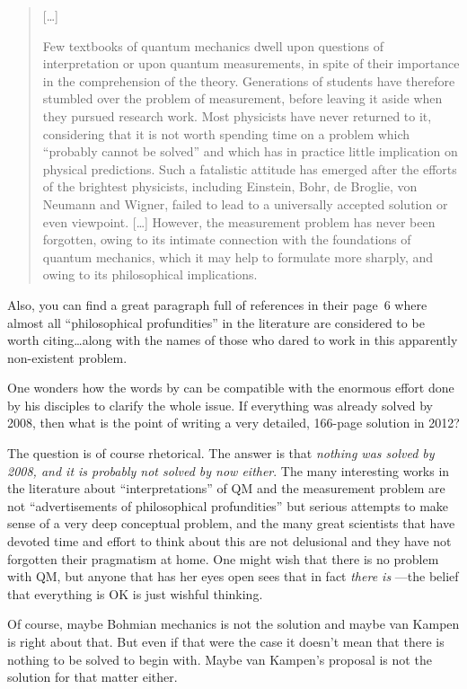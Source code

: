 \documentclass[a4paper,12pt]{article}
\begin{document}
\begin{itemize}
\begin{quote}
{[\ldots]

Few textbooks of quantum mechanics dwell upon questions of
interpretation or upon quantum measurements, in spite of their importance in
the comprehension of the theory. Generations of students have therefore
stumbled over the problem of measurement, before leaving it aside when they
pursued research work. Most physicists have never returned to it, considering
that it is not worth spending time on a problem which ``probably cannot be
solved'' and which has in practice little implication on physical predictions.
Such a fatalistic attitude has emerged after the efforts of the brightest
physicists, including Einstein, Bohr, de Broglie, von Neumann and Wigner,
failed to lead to a universally accepted solution or even viewpoint. [\ldots]
However, the measurement problem has never been forgotten, owing to its
intimate connection with the foundations of quantum mechanics, which it may
help to formulate more sharply, and owing to its philosophical implications.}
\end{quote}

Also, you can find a great paragraph full of references in their page~6 where
almost all ``philosophical profundities'' in the literature are considered to
be worth citing\ldots along with the names of those who dared to work in
this apparently non-existent problem.

\end{itemize}

One wonders how the words by \cite{VanKampen2008} can be compatible with the
enormous effort done by his disciples to clarify the whole issue. If
everything was already solved by 2008, then what is the point of writing a
very detailed, 166-page solution in 2012?

The question is of course rhetorical. The answer is that \emph{nothing was
solved by 2008, and it is probably not solved by now either}. The many
interesting works in the literature about ``interpretations'' of QM and the
measurement problem are not ``advertisements of philosophical profundities''
but serious attempts to make sense of a very deep conceptual problem, and the
many great scientists that have devoted time and effort to think about this
are not delusional and they have not forgotten their pragmatism at home. One
might wish that there is no problem with QM, but anyone that has her eyes open
sees that in fact \emph{there is} ---the belief that everything is OK is just
wishful thinking.

Of course, maybe Bohmian mechanics is not the solution and maybe van Kampen is
right about that. But even if that were the case it doesn't mean that there is
nothing to be solved to begin with. Maybe van Kampen's proposal is not the
solution for that matter either.
\end{document}
